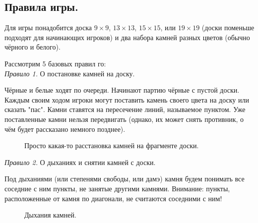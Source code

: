 \documentclass[14pt,a4paper]{extarticle}
\newcommand{\stone}[3]{\filldraw[color=black, fill=#3, very thick](#1,#2) circle(0.45);}
\newcommand{\territory}[3]{\filldraw[color=black, fill=#3, very thick](#1, #2) circle(0.125);}
\begin{document}
\subsection*{Правила игры.}

Для игры понадобится доска $9\times9$, $13\times13$, $15\times15$, или $19\times19$ (доски поменьше подходят для начинающих игроков) и два набора камней разных цветов (обычно чёрного и белого).

Рассмотрим 5 базовых правил го:\\

\textit{Правило 1.} О постановке камней на доску.

Чёрные и белые ходят по очереди. Начинают партию чёрные с пустой доски. Каждым своим ходом игроки могут поставить камень своего цвета на доску или сказать "пас". Камни ставятся на пересечение линий, называемое пунктом. Уже поставленные камни нельзя передвигать (однако, их может снять противник, о чём будет рассказано немного позднее).

\begin{figure}[h]
    \centering
    \caption{Просто какая-то расстановка камней на фрагменте доски.} \label{1}
\end{figure}

\textit{Правило 2.} О дыханиях и снятии камней с доски.

Под дыханиями (или степенями свободы, или дамэ) камня будем понимать все соседние с ним пункты, не занятые другими камнями. Внимание: пункты, расположенные от камня по диагонали, не считаются соседними с ним!


\newpage


\begin{figure}[h!]
    \centering
    \caption{Дыхания камней.} \label{2}
\end{figure}
\end{document}
